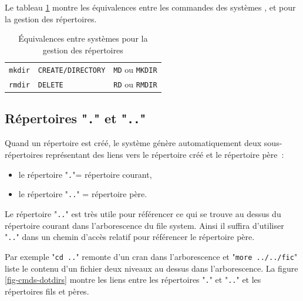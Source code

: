 Le
tableau \ref{tab-cmds-mkdir} montre les {\'e}quivalences entre les
commandes des syst{\`e}mes {\Unix}, {\OpenVMS} et {\DOS} pour la gestion
des r{\'e}pertoires.

\begin{table}[hbtp]
\centering
\begin{tabular}{|l|l|l|}
	\hline \centering
	{\Unix}		&	{\OpenVMS}				&	{\DOS}			\\
	\hline \hline
	{\tt mkdir}	&	{\tt CREATE/DIRECTORY}	&	{\tt MD} ou {\tt MKDIR}	\\
	{\tt rmdir}	&	{\tt DELETE}			&	{\tt RD} ou {\tt RMDIR}	\\
	\hline
\end{tabular}
\caption{\label{tab-cmds-mkdir}\'{E}quivalences entre syst{\`e}mes pour la gestion
des r{\'e}pertoires}
\end{table}

\subsection{R{\'e}pertoires "{\tt .}" et "{\tt ..}"}

Quand un r{\'e}pertoire est cr{\'e}{\'e}, le syst{\`e}me g{\'e}n{\`e}re
automatiquement deux sous-r{\'e}pertoires repr{\'e}sentant des liens
vers le r{\'e}pertoire cr{\'e}{\'e} et le r{\'e}pertoire p{\`e}re~:
\begin{itemize}
	\item	le r{\'e}pertoire "{\tt .}"= r{\'e}pertoire courant,
	\item	le r{\'e}pertoire "{\tt ..}" = r{\'e}pertoire p{\`e}re.
\end{itemize}

Le r{\'e}pertoire "{\tt ..}" est tr{\`e}s utile pour r{\'e}f{\'e}rencer ce qui se
trouve au dessus du r{\'e}pertoire courant dans l'arborescence du file
system. Ainsi il suffira d'utiliser "{\tt ..}" dans un chemin d'acc{\`e}s
relatif pour r{\'e}f{\'e}rencer le r{\'e}pertoire p{\`e}re.

Par exemple "{\tt cd ..}" remonte d'un cran dans l'arborescence et
"{\tt more ../../fic}" liste le contenu d'un fichier deux niveaux au
dessus dans l'arborescence. La figure \ref{fig-cmds-dotdirs} montre les
liens entre les r{\'e}pertoires "{\tt .}" et "{\tt ..}" et les r{\'e}pertoires
fils et p{\`e}res.

